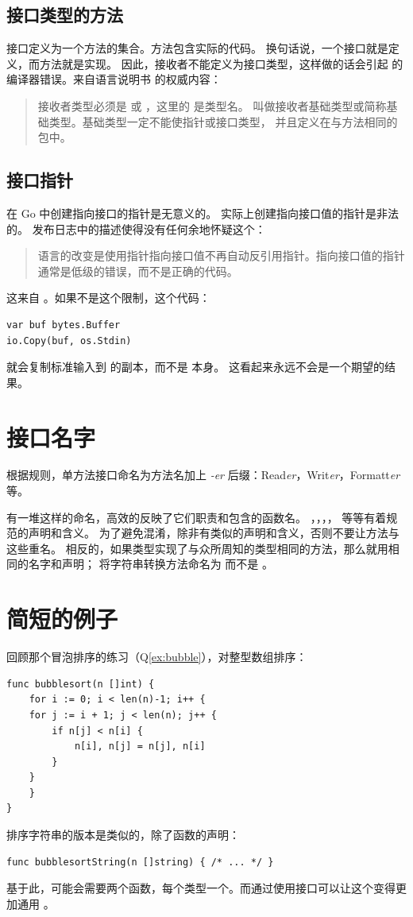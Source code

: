 \subsection{接口类型的方法}
接口定义为一个方法的集合。方法包含实际的代码。
换句话说，一个接口就是定义，而方法就是实现。
因此，接收者不能定义为接口类型，这样做的话会引起
 的编译器错误。来自语言说明书 \cite{go_spec} 的权威内容：
\begin{quote}
接收者类型必须是  或 ，这里的  是类型名。
 叫做接收者基础类型或简称基础类型。基础类型一定不能使指针或接口类型，
并且定义在与方法相同的包中。
\end{quote}

\subsection{接口指针}
在 Go 中创建指向接口的指针是无意义的。
 实际上创建指向接口值的指针是非法的。
发布日志中的描述使得没有任何余地怀疑这个：
\begin{quote}
语言的改变是使用指针指向接口值不再自动反引用指针。指向接口值的指针通常是低级的错误，而不是正确的代码。
\end{quote}
这来自 \cite{go_faq}。如果不是这个限制，这个代码：
\begin{lstlisting}
var buf bytes.Buffer
io.Copy(buf, os.Stdin)
\end{lstlisting}
就会复制标准输入到  的副本，而不是  本身。
这看起来永远不会是一个期望的结果。

\section{接口名字}
根据规则，单方法接口命名为方法名加上 \emph{-er} 后缀：Read\emph{er}，Writ\emph{er}，Formatt\emph{er} 等。

有一堆这样的命名，高效的反映了它们职责和包含的函数名。
，，，， 等等有着规范的声明和含义。
为了避免混淆，除非有类似的声明和含义，否则不要让方法与这些重名。
相反的，如果类型实现了与众所周知的类型相同的方法，那么就用相同的名字和声明；
将字符串转换方法命名为  而不是 。

\section{简短的例子}
\label{sec:a sorting example}
回顾那个冒泡排序的练习（Q\ref{ex:bubble}），对整型数组排序：
\begin{lstlisting}
func bubblesort(n []int) {
    for i := 0; i < len(n)-1; i++ {
	for j := i + 1; j < len(n); j++ {
	    if n[j] < n[i] {
		    n[i], n[j] = n[j], n[i]
	    }
	}
    }
}
\end{lstlisting}
排序字符串的版本是类似的，除了函数的声明：
\begin{lstlisting}
func bubblesortString(n []string) { /* ... */ }
\end{lstlisting}
基于此，可能会需要两个函数，每个类型一个。而通过使用接口可以让这个变得更加通用 。

